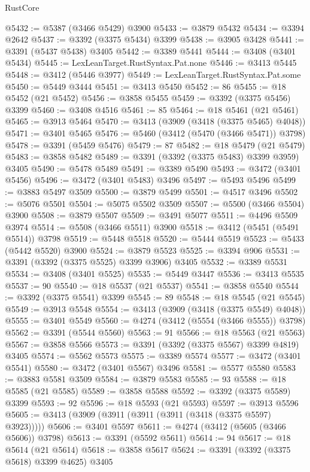 \begin{lexlean}{RustCore}
\begin{coremodule}
@5432 := @5387 (@3466 @5429) @3900
@5433 := @3879 @5432
@5434 := @3394 @2642
@5437 := @3392 (@3375 @5434) @3399
@5438 := @3905 @3428
@5441 := @3391 (@5437 @5438) @3405
@5442 := @3389 @5441
@5444 := @3408 (@3401 @5434)
@5445 := LexLeanTarget.RustSyntax.Pat.none
@5446 := @3413 @5445
@5448 := @3412 (@5446 @3977)
@5449 := LexLeanTarget.RustSyntax.Pat.some
@5450 := @5449 @3444
@5451 := @3413 @5450
@5452 := 86
@5455 := @18 @5452 (@21 @5452)
@5456 := @3858 @5455
@5459 := @3392 (@3375 @5456) @3399
@5460 := @3408 @4516
@5461 := 85
@5464 := @18 @5461 (@21 @5461)
@5465 := @3913 @5464
@5470 := @3413 (@3909 (@3418 (@3375 @5465) @4048))
@5471 := @3401 @5465
@5476 := @5460 (@3412 (@5470 (@3466 @5471)) @3798)
@5478 := @3391 (@5459 @5476)
@5479 := 87
@5482 := @18 @5479 (@21 @5479)
@5483 := @3858 @5482
@5489 := @3391 (@3392 (@3375 @5483) @3399 @3959) @3405
@5490 := @5478 @5489
@5491 := @3389 @5490
@5493 := @3472 (@3401 @5456)
@5496 := @3472 (@3401 @5483) @3496
@5497 := @5493 @5496
@5499 := @3883 @5497 @3509
@5500 := @3879 @5499
@5501 := @4517 @3496
@5502 := @5076 @5501
@5504 := @5075 @5502 @3509
@5507 := @5500 (@3466 @5504) @3900
@5508 := @3879 @5507
@5509 := @3491 @5077
@5511 := @4496 @5509 @3974
@5514 := @5508 (@3466 @5511) @3900
@5518 := @3412 (@5451 (@5491 @5514)) @3798
@5519 := @5448 @5518
@5520 := @5444 @5519
@5523 := @5433 (@5442 @5520) @3900
@5524 := @3879 @5523
@5525 := @3394 @906
@5531 := @3391 (@3392 (@3375 @5525) @3399 @3906) @3405
@5532 := @3389 @5531
@5534 := @3408 (@3401 @5525)
@5535 := @5449 @3447
@5536 := @3413 @5535
@5537 := 90
@5540 := @18 @5537 (@21 @5537)
@5541 := @3858 @5540
@5544 := @3392 (@3375 @5541) @3399
@5545 := 89
@5548 := @18 @5545 (@21 @5545)
@5549 := @3913 @5548
@5554 := @3413 (@3909 (@3418 (@3375 @5549) @4048))
@5555 := @3401 @5549
@5560 := @4274 (@3412 (@5554 (@3466 @5555)) @3798)
@5562 := @3391 (@5544 @5560)
@5563 := 91
@5566 := @18 @5563 (@21 @5563)
@5567 := @3858 @5566
@5573 := @3391 (@3392 (@3375 @5567) @3399 @4819) @3405
@5574 := @5562 @5573
@5575 := @3389 @5574
@5577 := @3472 (@3401 @5541)
@5580 := @3472 (@3401 @5567) @3496
@5581 := @5577 @5580
@5583 := @3883 @5581 @3509
@5584 := @3879 @5583
@5585 := 93
@5588 := @18 @5585 (@21 @5585)
@5589 := @3858 @5588
@5592 := @3392 (@3375 @5589) @3399
@5593 := 92
@5596 := @18 @5593 (@21 @5593)
@5597 := @3913 @5596
@5605 := @3413 (@3909 (@3911 (@3911 (@3911 (@3418 (@3375 @5597) @3923)))))
@5606 := @3401 @5597
@5611 := @4274 (@3412 (@5605 (@3466 @5606)) @3798)
@5613 := @3391 (@5592 @5611)
@5614 := 94
@5617 := @18 @5614 (@21 @5614)
@5618 := @3858 @5617
@5624 := @3391 (@3392 (@3375 @5618) @3399 @4625) @3405

\end{coremodule}
\end{lexlean}
